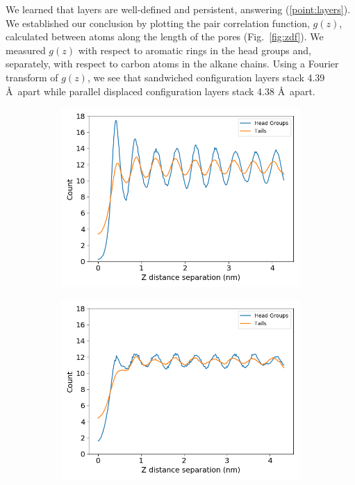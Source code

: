 \documentclass{article}
\newcommand{\angstrom}{\textup{\AA}}
\begin{document}
  We learned that layers are well-defined and persistent, answering
  (\ref{point:layers}). We established our conclusion by plotting the pair
  correlation function, $g(z)$, calculated between atoms along the length of the
  pores (Fig.~\ref{fig:zdf}). We measured $g(z)$ with respect to aromatic rings in
  the head groups and, separately, with respect to carbon atoms in the alkane
  chains. Using a Fourier transform of $g(z)$, we see that sandwiched
  configuration layers stack 4.39 \angstrom~apart while parallel displaced
  configuration layers stack 4.38 \angstrom~apart.

  \begin{figure}
        \centering
        \begin{subfigure}{0.45\textwidth}
                \centering
                \includegraphics[width=\textwidth]{zdf_overlay_layered.png}
                \caption{}\label{fig:zdf_layered}
        \end{subfigure}
        \begin{subfigure}{0.45\textwidth}
                \centering
                \includegraphics[width=\textwidth]{zdf_overlay_offset.png}

\end{subfigure}
\end{figure}
\end{document}
